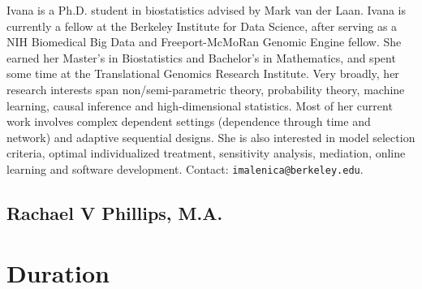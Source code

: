 \documentclass[a4paper,11pt]{texMemo}
\newcommand{\note}[2][]{\added[#1,remark={#2}]{}}
\begin{document}
Ivana is a Ph.D. student in biostatistics advised by Mark van der Laan. Ivana is currently a fellow at the Berkeley Institute for Data Science, after serving as a NIH Biomedical Big Data and Freeport-McMoRan Genomic Engine fellow. She earned her Master's in
Biostatistics and Bachelor's in Mathematics, and spent some time at the Translational Genomics Research Institute. Very broadly, her research interests span non/semi-parametric theory, probability theory, machine learning, causal inference and high-dimensional statistics. Most of her current work involves complex dependent settings (dependence through time and network) and adaptive sequential designs. She is also interested in model selection criteria, optimal individualized treatment, sensitivity analysis, mediation, online learning and software development. Contact: \texttt{imalenica@berkeley.edu}.

\vspace{-.5em}

\subsection*{Rachael V Phillips, M.A.}

\vspace{-.5em}


\section*{Duration}\note[id=RP]{sample schedule is too long. 6 hours including coffee breaks. I am guessing not including lunch?}
\end{document}
